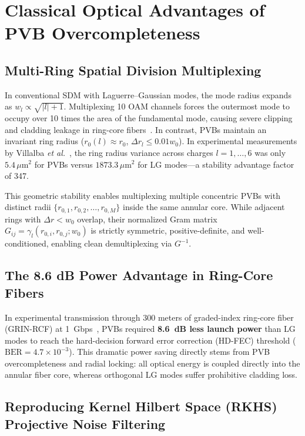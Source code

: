 \documentclass{optica-article}
\begin{document}
\section{Classical Optical Advantages of PVB Overcompleteness}
\label{sec:classical_advantages}

\subsection{Multi-Ring Spatial Division Multiplexing}

In conventional SDM with Laguerre--Gaussian modes, the mode radius expands as $w_l \propto \sqrt{|l| + 1}$. Multiplexing 10 OAM channels forces the outermost mode to occupy over 10 times the area of the fundamental mode, causing severe clipping and cladding leakage in ring-core fibers~\cite{Villalba2023}. In contrast, PVBs maintain an invariant ring radius ($r_0(l) \approx r_0$, $\Delta r_l \le 0.01 w_0$). In experimental measurements by Villalba \emph{et al.}~\cite{Villalba2023}, the ring radius variance across charges $l = 1, \dots, 6$ was only $5.4\,\mu\text{m}^2$ for PVBs versus $1873.3\,\mu\text{m}^2$ for LG modes---a stability advantage factor of 347.

This geometric stability enables multiplexing multiple concentric PVBs with distinct radii $\{r_{0, 1}, r_{0, 2}, \dots, r_{0, M}\}$ inside the same annular core. While adjacent rings with $\Delta r < w_0$ overlap, their normalized Gram matrix $G_{ij} = \gamma_l(r_{0, i}, r_{0, j}; w_0)$ is strictly symmetric, positive-definite, and well-conditioned, enabling clean demultiplexing via $G^{-1}$.

\subsection{The 8.6 dB Power Advantage in Ring-Core Fibers}

In experimental transmission through 300 meters of graded-index ring-core fiber (GRIN-RCF) at 1~Gbps~\cite{Villalba2023}, PVBs required \textbf{8.6~dB less launch power} than LG modes to reach the hard-decision forward error correction (HD-FEC) threshold ($\text{BER} = 4.7 \times 10^{-3}$). This dramatic power saving directly stems from PVB overcompleteness and radial locking: all optical energy is coupled directly into the annular fiber core, whereas orthogonal LG modes suffer prohibitive cladding loss.

\subsection{Reproducing Kernel Hilbert Space (RKHS) Projective Noise Filtering}
\end{document}
